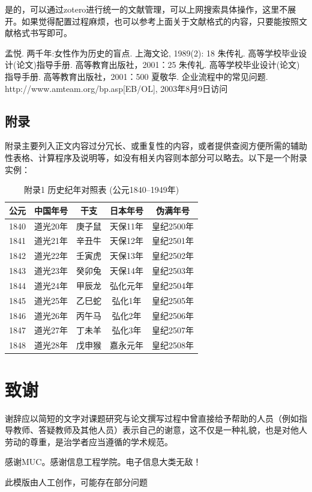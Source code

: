 \documentclass[12pt,a4paper]{ctexart}
\begin{document}
是的，可以通过zotero进行统一的文献管理，可以上网搜索具体操作，这里不展开。如果觉得配置过程麻烦，也可以参考上面关于文献格式的内容，只要能按照文献格式书写即可。

\newpage
\begin{thebibliography}{99}
    孟悦. 两千年:女性作为历史的盲点. 上海文论, 1989(2): 18
    朱传礼. 高等学校毕业设计(论文)指导手册. 高等教育出版社，2001：25
    朱传礼. 高等学校毕业设计(论文)指导手册. 高等教育出版社，2001：500
    夏敬华. 企业流程中的常见问题. http://www.amteam.org/bp.asp[EB/OL], 2003年8月9日访问
\end{thebibliography}

\newpage
\begin{appendices}
	\renewcommand{\thesection}{\Alph{section}}
    \captionsetup[table]{labelformat=empty,list=no} %
	\section{附录}
	附录主要列入正文内容过分冗长、或重复性的内容，或者提供查阅方便所需的辅助性表格、计算程序及说明等，如没有相关内容则本部分可以略去。以下是一个附录实例：

    \begin{table}[h]
    \centering
    \caption{附录1 历史纪年对照表 (公元1840--1949年)}
    \begin{tabular}{|c|c|c|c|c|}
    \hline
    公元 & 中国年号 & 干支 & 日本年号 & 伪满年号 \\
    \hline
    1840 & 道光20年 & 庚子鼠 & 天保11年 & 皇纪2500年 \\
    \hline
    1841 & 道光21年 & 辛丑牛 & 天保12年 & 皇纪2501年 \\
    \hline
    1842 & 道光22年 & 壬寅虎 & 天保13年 & 皇纪2502年 \\
    \hline
    1843 & 道光23年 & 癸卯兔 & 天保14年 & 皇纪2503年 \\
    \hline
    1844 & 道光24年 & 甲辰龙 & 弘化元年 & 皇纪2504年 \\
    \hline
    1845 & 道光25年 & 乙巳蛇 & 弘化1年 & 皇纪2505年 \\
    \hline
    1846 & 道光26年 & 丙午马 & 弘化2年 & 皇纪2506年 \\
    \hline
    1847 & 道光27年 & 丁未羊 & 弘化3年 & 皇纪2507年 \\
    \hline
    1848 & 道光28年 & 戊申猴 & 嘉永元年 & 皇纪2508年 \\
    \hline
    \end{tabular}
    \end{table}

\end{appendices}

\newpage
\section*{致谢}
谢辞应以简短的文字对课题研究与论文撰写过程中曾直接给予帮助的人员（例如指导教师、答疑教师及其他人员）表示自己的谢意，这不仅是一种礼貌，也是对他人劳动的尊重，是治学者应当遵循的学术规范。

感谢MUC。感谢信息工程学院。电子信息大类无敌！

此模版由人工创作，可能存在部分问题
\end{document}
